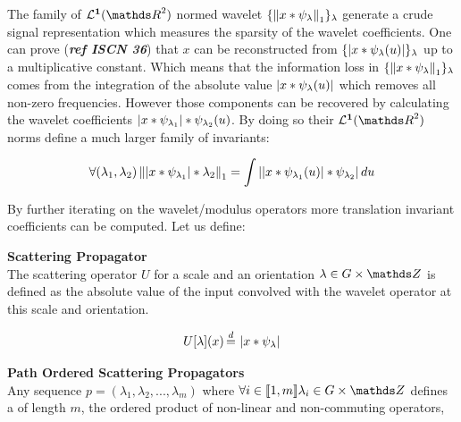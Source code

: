 \documentclass[a4paper,11pt]{report}
\begin{document}
{      The family of $\mathbf{\mathcal{L}^{1}}(\dsR^{2})$ normed wavelet $\{ \left\lVert x \ast \psi_{\lambda} \right\rVert_{1}\}_{\lambda}$ generate a crude signal representation which measures the sparsity of the wavelet coefficients. One can prove (\textbf{\textit{ref ISCN 36}}) that $x$ can be reconstructed from $\{ \left|  x \ast \psi_{\lambda}(u) \right| \}_{\lambda}$ up to a multiplicative constant. Which means that the information loss in $\{ \left\lVert x \ast \psi_{\lambda} \right\rVert_{1} \}_{\lambda}$ comes from the integration of the absolute value $\left|  x \ast \psi_{\lambda}(u) \right|$ which removes all non-zero frequencies. However those components can be recovered by calculating the wavelet coefficients $\left|  x \ast \psi_{\lambda_{1}} \right| \ast \psi_{\lambda_{2}}(u)$. By doing so their $\mathbf{\mathcal{L}^{1}}(\dsR^{2})$ norms define a much larger family of invariants:
      
      \begin{equation*}
				\label{eq:2nd order}
				\forall (\lambda_{1}, \lambda_{2}) 
				\left\lVert  \left|  x \ast \psi_{\lambda_{1}} \right| \ast \lambda_{2} \right\rVert_{1} =
				\int \left|  \left|  x \ast \psi_{\lambda_{1}}(u) \right| \ast \psi_{\lambda_{2}} \right| du
      \end{equation*}          
      
      By further iterating on the wavelet/modulus operators more translation invariant coefficients can be computed. Let us define:
      
      \begin{defn} \textbf{Scattering Propagator}\\ 
				The scattering operator $U$ for a scale and an orientation $\lambda \in G \times \dsZ$ is defined as the absolute value of the input convolved with the wavelet operator at this scale and orientation.
				
				\begin{equation}
					\label{eq:scattering propagator}
					U[\lambda](x) \eqdef \abs{x \ast \psi_{\lambda}}
				\end{equation}
				\label{def:SO}
			\end{defn}
						
			\begin{defn} \textbf{Path Ordered Scattering Propagators}\\ 
				Any sequence $p = (\lambda_{1}, \lambda_{2},...,\lambda_{m})$ where $\forall i \in \llbracket 1,m \rrbracket \lambda_{i} \in G \times \dsZ$ defines a  of length $m$, \ie the ordered product of non-linear and non-commuting operators,
				

\end{defn}}
\end{document}
